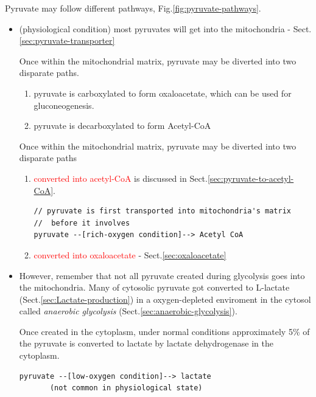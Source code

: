 Pyruvate may follow different pathways, Fig.\ref{fig:pyruvate-pathways}.
\begin{itemize}

  \item (physiological condition) most pyruvates will get into the mitochondria
  - Sect.\ref{sec:pyruvate-transporter}

Once within the mitochondrial matrix, pyruvate may be diverted into two
disparate paths.
\begin{enumerate}
  \item  pyruvate is carboxylated to form oxaloacetate, which can be used for
  gluconeogenesis.
  \item  pyruvate is decarboxylated to form Acetyl-CoA
\end{enumerate}

Once within the mitochondrial matrix, pyruvate may be diverted into two
disparate paths
\begin{enumerate}
  \item \textcolor{red}{converted into acetyl-CoA} is discussed in
  Sect.\ref{sec:pyruvate-to-acetyl-CoA}.

\begin{verbatim}
// pyruvate is first transported into mitochondria's matrix
//  before it involves
pyruvate --[rich-oxygen condition]--> Acetyl CoA
\end{verbatim}


  \item \textcolor{red}{converted into oxaloacetate} -
  Sect.\ref{sec:oxaloacetate}
\end{enumerate}



  \item  However, remember that not all pyruvate created during glycolysis goes
  into the mitochondria. Many of cytosolic pyruvate got converted to
  L-lactate (Sect.\ref{sec:Lactate-production}) in a oxygen-depleted enviroment
  in the cytosol called {\it anaerobic
  glycolysis} (Sect.\ref{sec:anaerobic-glycolysis}).

Once created in the cytoplasm, under normal conditions approximately 5\% of the
pyruvate is converted to lactate by lactate dehydrogenase in the cytoplasm.
\begin{verbatim}
pyruvate --[low-oxygen condition]--> lactate
       (not common in physiological state)
\end{verbatim}

\end{itemize}



